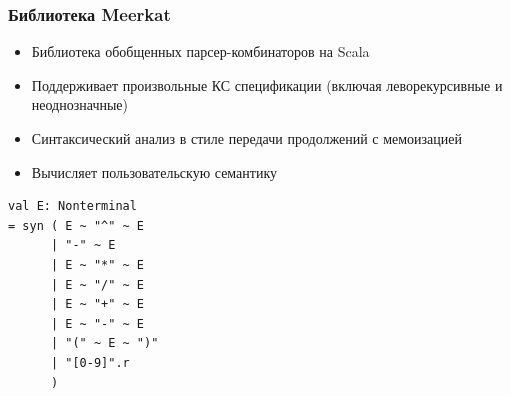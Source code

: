 \documentclass[xcolor=table]{beamer}
\begin{document}
\begin{frame}[fragile]
  \transwipe[direction=90]
  \frametitle{Библиотека Meerkat}
\begin{itemize}
  \item Библиотека обобщенных парсер-комбинаторов на Scala
  \item Поддерживает произвольные КС спецификации (включая леворекурсивные и неоднозначные)
  \item Синтаксический анализ в стиле передачи продолжений с мемоизацией
  \item Вычисляет пользовательскую семантику
\end{itemize}

\begin{lstlisting}
val E: Nonterminal
= syn ( E ~ "^" ~ E
      | "-" ~ E
      | E ~ "*" ~ E
      | E ~ "/" ~ E
      | E ~ "+" ~ E
      | E ~ "-" ~ E
      | "(" ~ E ~ ")"
      | "[0-9]".r
      )
\end{lstlisting}
\end{frame}
\end{document}
